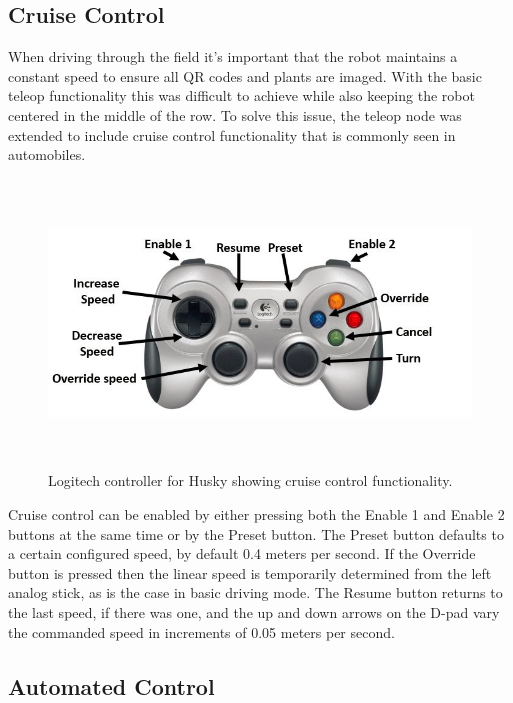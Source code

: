 \subsection{Cruise Control}

When driving through the field it's important that the robot maintains a constant speed to ensure all QR codes and plants are imaged.  With the basic teleop functionality this was difficult to achieve while also keeping the robot centered in the middle of the row. To solve this issue, the teleop node was extended to include cruise control functionality that is commonly seen in automobiles.  

\begin{figure}
	\centering
    \includegraphics[height=3in]{figures/logitech_controller_labelled.jpg}
    \caption[Cruise control buttons]{Logitech controller for Husky showing cruise control functionality.}
    \label{figure:cruise_control}
\end{figure}

Cruise control can be enabled by either pressing both the Enable 1 and Enable 2 buttons at the same time or by the Preset button.  The Preset button defaults to a certain configured speed, by default 0.4 meters per second.  If the Override button is pressed then the linear speed is temporarily determined from the left analog stick, as is the case in basic driving mode.  The Resume button returns to the last speed, if there was one, and the up and down arrows on the D-pad vary the commanded speed in increments of 0.05 meters per second.    

\subsection{Automated Control}
\label{section:automated_control}

